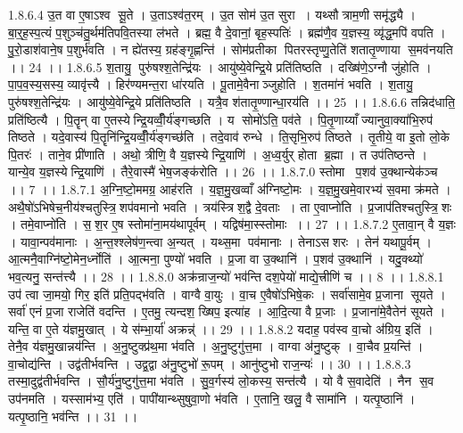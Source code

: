 1.8.6.4
उ॒त वा ए॒षाऽश्व॑ सू॒ते । उ॒ताऽश्व॑त॒रम् । उ॒त सोम॑ उ॒त सुरा । यथ्सौत्राम॒णी समृ॑द्ध्यै । बा॒र्॒ह॒स्प॒त्यं प॒शुञ्च॑तु॒र्थम॑तिपवि॒तस्या ल॑भते । ब्रह्म॒ वै दे॒वानां॒ बृह॒स्पतिः॑ । ब्रह्म॑णै॒व य॒ज्ञस्य॒ व्यृ॑द्ध॒मपि॑ वपति । पु॒रो॒डाश॑वाने॒ष प॒शुर्भ॑वति । न ह्ये॑तस्य॒ ग्रह॑ङ्गृ॒ह्णन्ति॑ । सोम॑प्रतीका पितरस्तृप्णु॒तेति॑ शतातृ॒ण्णाया॑ स॒मव॑नयति ।। 24 ।।
1.8.6.5
श॒तायु॒ पुरु॑षश्श॒तेन्द्रि॑यः । आयु॑ष्ये॒वेन्द्रि॒ये प्रति॑तिष्ठति । दख्षि॑णे॒ऽग्नौ जु॑होति । पा॒प॒व॒स्य॒सस्य॒ व्यावृ॑त्त्यै । हिर॑ण्यमन्त॒रा धा॑रयति । पू॒तामे॒वैनाञ्जुहोति । श॒तमा॑नं भवति । श॒तायु॒ पुरु॑षश्श॒तेन्द्रि॑यः । आयु॑ष्ये॒वेन्द्रि॒ये प्रति॑तिष्ठति । यत्रै॒व श॑तातृ॒ण्णान्धा॒रय॑ति ।। 25 ।।
1.8.6.6
तन्निद॑धाति॒ प्रति॑ष्ठित्यै । पि॒तॄन् वा ए॒तस्येन्द्रि॒यव्वीँ॒र्य॑ङ्गच्छति । य सोमो॑ऽति॒ पव॑ते । पि॒तृ॒णाय्याँज्यानुवा॒क्या॑भि॒रुप॑ तिष्ठते । यदे॒वास्य॑ पि॒तॄनि॑न्द्रि॒यव्वीँ॒र्य॑ङ्गच्छ॑ति । तदे॒वाव॑ रुन्धे । ति॒सृभि॒रुप॑ तिष्ठते । तृ॒तीये॒ वा इ॒तो लो॒के पि॒तरः॑ । ताने॒व प्री॑णाति । अथो॒ त्रीणि॒ वै य॒ज्ञस्येन्द्रि॒याणि॑ । अ॒ध्व॒र्युर् होता ब्र॒ह्मा । त उप॑तिष्ठन्ते । यान्ये॒व य॒ज्ञस्येन्द्रि॒याणि॑ । तैरे॒वास्मै॑ भेष॒जङ्क॑रोति ।। 26 ।।
1.8.7.0
स्तोमा प॒शव॑ उ॒क्थान्येक॑ञ्च ।। 7 ।।
1.8.7.1
अ॒ग्नि॒ष्टो॒ममग्र॒ आह॑रति । य॒ज्ञ॒मु॒खव्वाँ अ॑ग्निष्टो॒मः । य॒ज्ञ॒मु॒खमे॒वारभ्य॑ स॒वमा क्र॑मते । अथै॒षो॑ऽभिषेच॒नीय॑श्चतुस्त्रि॒॒शप॑वमानो भवति । त्रय॑स्त्रिश॒द्वै दे॒वताः । ता ए॒वाप्नो॑ति । प्र॒जाप॑तिश्चतुस्त्रि॒॒शः । तमे॒वाप्नो॑ति । स॒॒श॒र ए॒ष स्तोमा॑ना॒मय॑थापूर्वम् । यद्विष॑मा॒स्स्तोमाः ।। 27 ।।
1.8.7.2
ए॒तावा॒न् वै य॒ज्ञः । यावा॒न्पव॑मानाः । अ॒न्त॒श्श्लेष॑ण॒न्त्वा अ॒न्यत् । यथ्स॒मा पव॑मानाः । तेनाऽस॑शरः । तेन॑ यथापू॒र्वम् । आ॒त्मनै॒वाग्नि॑ष्टो॒मेन॒र्ध्नोति॑ । आ॒त्मना॒ पुण्यो॑ भवति । प्र॒जा वा उ॒क्थानि॑ । प॒शव॑ उ॒क्थानि॑ । यदु॒क्थ्यो॑ भव॒त्यनु॒ सन्त॑त्त्यै ।। 28 ।।
1.8.8.0
अक्र॑न्राज॒न्यो॑ भव॑न्ति दश॒पेयो॑ माद्ये॒त्त्रीणि॑ च ।। 8 ।।
1.8.8.1
उप॑ त्वा जा॒मयो॒ गिर॒ इति॑ प्रति॒पद्भ॑वति । वाग्वै वा॒युः । वा॒च ए॒वैषो॑ऽभिषे॒कः । सर्वा॑सामे॒व प्र॒जाना॑ सूयते । सर्वा॑ एनं प्र॒जा राजेति॑ वदन्ति । ए॒तमु॒ त्यन्दश॒ ख्षिप॒ इत्या॑ह । आ॒दि॒त्या वै प्र॒जाः । प्र॒जाना॑मे॒वैतेन॑ सूयते । यन्ति॒ वा ए॒ते य॑ज्ञमु॒खात् । ये स॑म्भा॒र्या॑ अक्रन्न्॑ ।। 29 ।।
1.8.8.2
यदाह॒ पव॑स्व वा॒चो अ॑ग्रिय॒ इति॑ । तेनै॒व य॑ज्ञमु॒खान्नय॑न्ति । अ॒नु॒ष्टुक्प्र॑थ॒मा भ॑वति । अ॒नु॒ष्टुगु॑त्त॒मा । वाग्वा अ॑नु॒ष्टुक् । वा॒चैव प्र॒यन्ति॑ । वा॒चोद्य॑न्ति । उद्व॑तीर्भवन्ति । उद्व॒द्वा अ॑नु॒ष्टुभो॑ रू॒पम् । आनु॑ष्टुभो राज॒न्यः॑ ।। 30 ।।
1.8.8.3
तस्मा॒दुद्व॑तीर्भवन्ति । सौ॒र्य॑नु॒ष्टुगु॑त्त॒मा भ॑वति । सु॒व॒र्गस्य॑ लो॒कस्य॒ सन्त॑त्यै । यो वै स॒वादेति॑ । नैन॑ स॒व उप॑नमति । यस्साम॑भ्य॒ एति॑ । पापी॑यान्थ्सुषुवा॒णो भ॑वति । ए॒तानि॒ खलु॒ वै सामा॑नि । यत्पृ॒ष्ठानि॑ । यत्पृ॒ष्ठानि॒ भव॑न्ति ।। 31 ।।
